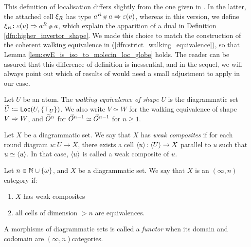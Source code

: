 \begin{comm} \label{comm:diff_of_localisation}
    This definition of localisation differs slightly from the one given in \cite[2.38]{chanavat2024model}. 
    In the latter, the attached cell \( \xi_{R} \) has type \( a^R \,{\scriptstyle\#}_{}\, a \Rightarrow \varepsilon(v) \), whereas in this version, we define \( \xi_{R} \colon \varepsilon(v) \Rightarrow a^R \,{\scriptstyle\#}_{}\, a \), which explain the apparition of a dual in Definition \ref{dfn:higher_invertor_shape}.
    We made this choice to match the construction of the coherent walking equivalence in (\ref{dfn:strict_walking_equivalence}), so that Lemma \ref{lem:swE_is_iso_to_molecin_loc_globe} holds.
    The reader can be assured that this difference of definition is inessential, and in the sequel, we will always point out which of results of \cite{chanavat2024model} would need a small adjustment to apply in our case. 
\end{comm}

\begin{dfn} 
    Let \( U \) be an atom.
    The \emph{walking equivalence of shape \( U \)} is the diagrammatic set \( \widetilde{U} \coloneqq \operatorname{\mathsf{Loc}} (U, \left\{ {\top_U} \right\}) \).
    We also write \( V \simeq W \) for the walking equivalence of shape \( V \Rightarrow W \), and \( \widetilde{O}^{n} \) for \( \vec{O}^{n - 1} \simeq \vec{O}^{n - 1} \) for \( n \geq 1 \). 
\end{dfn}

\begin{dfn} 
    Let \( X \) be a diagrammatic set.
    We say that \( X \) has \emph{weak composites} if for each round diagram \( u \colon U \to X \), there exists a cell \( \langle u\rangle \colon \langle U\rangle \to X \) parallel to \( u \) such that \( u \simeq \langle u\rangle \).
    In that case, \( \langle u\rangle \) is called a weak composite of \( u \).
\end{dfn}

\begin{dfn}  \label{dfn:infty_n_cat}
    Let \( n \in \mathbb{N} \cup \left\{ {\omega} \right\} \), and \( X \) be a diagrammatic set.
    We say that \( X \) is an \( (\infty, n) \)\nbd category if:
    \begin{enumerate}
        \item \( X \) has weak composites
        \item all cells of dimension \( > n \) are equivalences.
    \end{enumerate}
    
    A morphisms of diagrammatic sets is called a \emph{functor} when its domain and codomain are \( (\infty, n) \)\nbd categories. 
\end{dfn}

